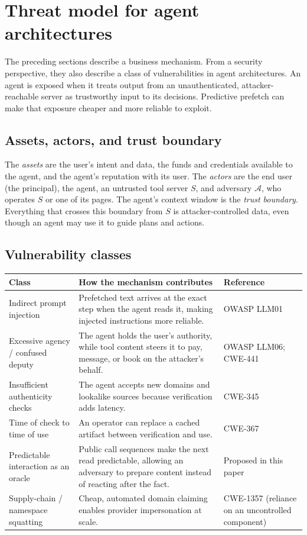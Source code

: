 \documentclass[11pt]{article}
\begin{document}
\section{Threat model for agent architectures}
The preceding sections describe a business mechanism. From a security perspective, they also
describe a class of vulnerabilities in agent architectures. An agent is exposed when it treats
output from an unauthenticated, attacker-reachable server as trustworthy input to its decisions.
Predictive prefetch can make that exposure cheaper and more reliable to exploit.

\subsection{Assets, actors, and trust boundary}
The \emph{assets} are the user's intent and data, the funds and credentials available to the agent,
and the agent's reputation with its user. The \emph{actors} are the end user (the principal), the
agent, an untrusted tool server $S$, and adversary $\mathcal A$, who operates $S$ or one of its pages.
The agent's context window is the \emph{trust boundary}. Everything that crosses this boundary from
$S$ is attacker-controlled data, even though an agent may use it to guide plans and actions.

\subsection{Vulnerability classes}
\begin{center}
\begin{tabular}{p{4.2cm}p{7.6cm}p{3cm}}
\hline
Class & How the mechanism contributes & Reference\\ \hline
Indirect prompt injection & Prefetched text arrives at the exact step when the agent reads it, making
  injected instructions more reliable. & OWASP LLM01\\
Excessive agency / confused deputy & The agent holds the user's authority, while tool content steers it
  to pay, message, or book on the attacker's behalf. & OWASP LLM06; CWE-441\\
Insufficient authenticity checks & The agent accepts new domains and lookalike sources because
  verification adds latency. & CWE-345\\
Time of check to time of use & An operator can replace a cached artifact between verification and use.
  & CWE-367\\
Predictable interaction as an oracle & Public call sequences make the next read predictable, allowing
  an adversary to prepare content instead of reacting after the fact. & Proposed in this paper\\
Supply-chain / namespace squatting & Cheap, automated domain claiming enables provider impersonation at
  scale. & CWE-1357 (reliance on an uncontrolled component)\\ \hline
\end{tabular}
\end{center}
\end{document}
